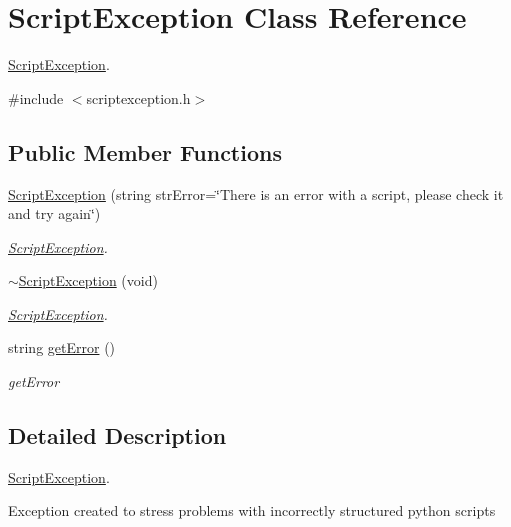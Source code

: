 \hypertarget{class_script_exception}{\section{\-Script\-Exception \-Class \-Reference}
\label{class_script_exception}
}


\hyperlink{class_script_exception}{\-Script\-Exception}.  




{\ttfamily \#include $<$scriptexception.\-h$>$}

\subsection*{\-Public \-Member \-Functions}
\begin{DoxyCompactItemize}
\item 
\hyperlink{class_script_exception_a664911ed534dc2822aa7786d939a4b32}{\-Script\-Exception} (string str\-Error=\char`\"{}\-There is an error with a script, please check it and try again\char`\"{})
\begin{DoxyCompactList}\small\item\em \hyperlink{class_script_exception}{\-Script\-Exception}. \end{DoxyCompactList}\item 
\hyperlink{class_script_exception_a3dc2ca5a93e9a013b64a17557ed57830}{$\sim$\-Script\-Exception} (void)
\begin{DoxyCompactList}\small\item\em \hyperlink{class_script_exception}{\-Script\-Exception}. \end{DoxyCompactList}\item 
string \hyperlink{class_script_exception_a9642e63270700c02c2f7f1727edf0ab5}{get\-Error} ()
\begin{DoxyCompactList}\small\item\em get\-Error \end{DoxyCompactList}\end{DoxyCompactItemize}


\subsection{\-Detailed \-Description}
\hyperlink{class_script_exception}{\-Script\-Exception}. 

\-Exception created to stress problems with incorrectly structured python scripts 

